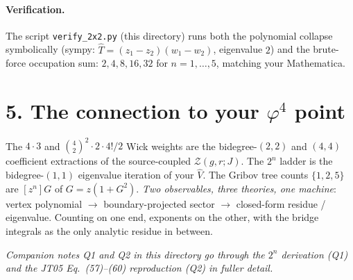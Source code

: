 \documentclass[11pt,a4paper]{article}
\begin{document}
\paragraph{Verification.} The script \texttt{verify\_2x2.py} (this directory) runs both the polynomial collapse symbolically (sympy: $\widehat T = (z_1-z_2)(w_1-w_2)$, eigenvalue $2$) and the brute-force occupation sum: $2,4,8,16,32$ for $n=1,\dots,5$, matching your Mathematica.

\section*{5. The connection to your $\varphi^4$ point}

The $4\cdot 3$ and $\binom{4}{2}^2\cdot 2\cdot 4!/2$ Wick weights are the bidegree-$(2,2)$ and $(4,4)$ coefficient extractions of the source-coupled $\mathcal Z(g,r;J)$. The $2^n$ ladder is the bidegree-$(1,1)$ eigenvalue iteration of your $\widehat V$. The Gribov tree counts $\{1,2,5\}$ are $[z^n]G$ of $G=z(1+G^2)$. \emph{Two observables, three theories, one machine}: vertex polynomial $\to$ boundary-projected sector $\to$ closed-form residue / eigenvalue. Counting on one end, exponents on the other, with the bridge integrals as the only analytic residue in between.

\medskip
\noindent\emph{Companion notes Q1 and Q2 in this directory go through the $2^n$ derivation (Q1) and the JT05 Eq.~(57)--(60) reproduction (Q2) in fuller detail.}
\end{document}
